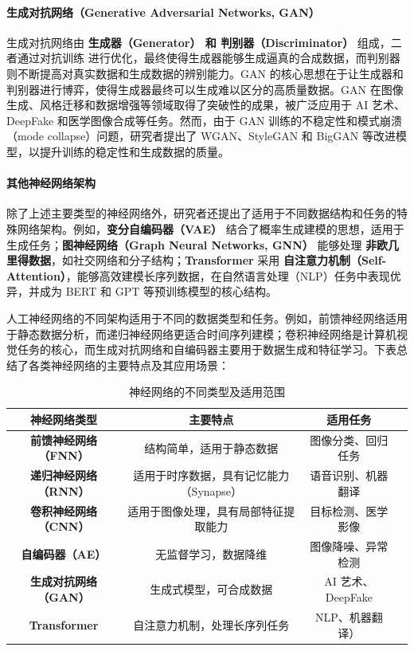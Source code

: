 \paragraph*{生成对抗网络（Generative Adversarial Networks, GAN）  }
生成对抗网络由 {\bf 生成器（Generator） 和 判别器（Discriminator） }组成，二者通过对抗训练 进行优化，最终使得生成器能够生成逼真的合成数据，而判别器则不断提高对真实数据和生成数据的辨别能力。GAN 的核心思想在于让生成器和判别器进行博弈，使得生成器最终可以生成难以区分的高质量数据。GAN 在图像生成、风格迁移和数据增强等领域取得了突破性的成果，被广泛应用于 AI 艺术、DeepFake 和医学图像合成等任务。然而，由于 GAN 训练的不稳定性和模式崩溃（mode collapse）问题，研究者提出了 WGAN、StyleGAN 和 BigGAN 等改进模型，以提升训练的稳定性和生成数据的质量。

\paragraph*{其他神经网络架构}
除了上述主要类型的神经网络外，研究者还提出了适用于不同数据结构和任务的特殊网络架构。例如，{\bf 变分自编码器（VAE）} 结合了概率生成建模的思想，适用于生成任务；{\bf 图神经网络（Graph Neural Networks, GNN）} 能够处理 {\bf 非欧几里得数据}，如社交网络和分子结构；{\bf Transformer }采用 {\bf 自注意力机制（Self-Attention）}，能够高效建模长序列数据，在自然语言处理（NLP）任务中表现优异，并成为 BERT 和 GPT 等预训练模型的核心结构。

人工神经网络的不同架构适用于不同的数据类型和任务。例如，前馈神经网络适用于静态数据分析，而递归神经网络更适合时间序列建模；卷积神经网络是计算机视觉任务的核心，而生成对抗网络和自编码器主要用于数据生成和特征学习。下表总结了各类神经网络的主要特点及其应用场景：
\begin{table}[htbp]
\centering
\caption{神经网络的不同类型及适用范围}
\begin{tabular}{|c|c|c|c|}
\hline
{\bf  神经网络类型} & {\bf  主要特点 } & {\bf 适用任务}  \\
\hline
{\bf 前馈神经网络（FNN）} &  结构简单，适用于静态数据  &  图像分类、回归任务  \\
\hline
{\bf 递归神经网络（RNN）}  &  适用于时序数据，具有记忆能力（Synapse）& 语音识别、机器翻译 \\
\hline
{\bf 卷积神经网络（CNN） }  & 适用于图像处理，具有局部特征提取能力&  目标检测、医学影像 \\
\hline
{\bf 自编码器（AE） }  &  无监督学习，数据降维 &  图像降噪、异常检测\\
\hline
{\bf 生成对抗网络（GAN） }  &  生成式模型，可合成数据 &  AI 艺术、DeepFake\\
\hline
{\bf Transformer}  &  自注意力机制，处理长序列任务  &  NLP、机器翻译）\\
\hline
\end{tabular}
\label{神经网络的不同类型及适用范围}
\end{table}


